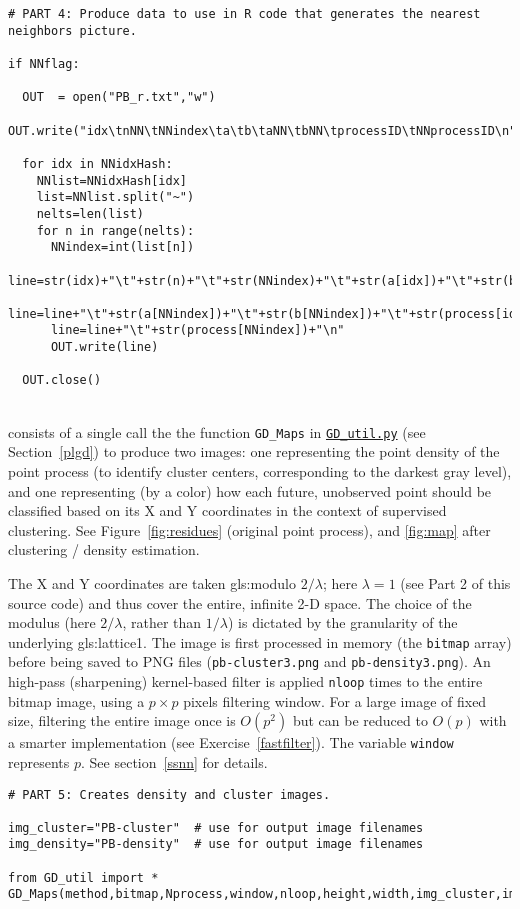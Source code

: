 \documentclass[10pt]{article}
\begin{document}
\begin{lstlisting}
# PART 4: Produce data to use in R code that generates the nearest neighbors picture.

if NNflag:

  OUT  = open("PB_r.txt","w")
  OUT.write("idx\tnNN\tNNindex\ta\tb\taNN\tbNN\tprocessID\tNNprocessID\n")

  for idx in NNidxHash:
    NNlist=NNidxHash[idx]
    list=NNlist.split("~")
    nelts=len(list)
    for n in range(nelts):
      NNindex=int(list[n])
      line=str(idx)+"\t"+str(n)+"\t"+str(NNindex)+"\t"+str(a[idx])+"\t"+str(b[idx])
      line=line+"\t"+str(a[NNindex])+"\t"+str(b[NNindex])+"\t"+str(process[idx])
      line=line+"\t"+str(process[NNindex])+"\n"
      OUT.write(line)

  OUT.close()
\end{lstlisting}
\quad \\
 consists of a single call the the function \texttt{GD\_Maps} in
\href{https://bit.ly/3vmEGek}{\texttt{GD\_util.py}} (see Section~\ref{plgd}) to produce two images:
one representing the point density of the point process (to identify cluster centers, corresponding to the darkest gray level), and one representing (by a color) how each future, unobserved point should
be classified based on its X and Y coordinates in the context of supervised clustering. See Figure~\ref{fig:residues} (original point process), and
\ref{fig:map} after clustering / density estimation.

The X and Y coordinates are taken
 \gls{gls:modulo} $2/\lambda$; here $\lambda=1$ (see Part 2 of this source code)
and thus cover the entire, infinite 2-D space. The choice of the modulus (here $2/\lambda$, rather than $1/\lambda$) is dictated by the granularity of the underlying
\gls{gls:lattice1}. The image is first processed
in memory (the \texttt{bitmap} array) before being saved to PNG files (\texttt{pb-cluster3.png} and \texttt{pb-density3.png}). An
high-pass (sharpening) kernel-based filter is applied
\texttt{nloop} times to the entire bitmap image, using a $p\times p$ pixels filtering window. For a large image of fixed size, filtering the entire image once is $O(p^2)$
 but can be reduced to $O(p)$ with a smarter implementation (see Exercise~\ref{fastfilter}). The variable \texttt{window} represents $p$.
See section~\ref{ssnn} for details.

\begin{lstlisting}
# PART 5: Creates density and cluster images.

img_cluster="PB-cluster"  # use for output image filenames
img_density="PB-density"  # use for output image filenames

from GD_util import *
GD_Maps(method,bitmap,Nprocess,window,nloop,height,width,img_cluster,img_density)
\end{lstlisting}
\end{document}
